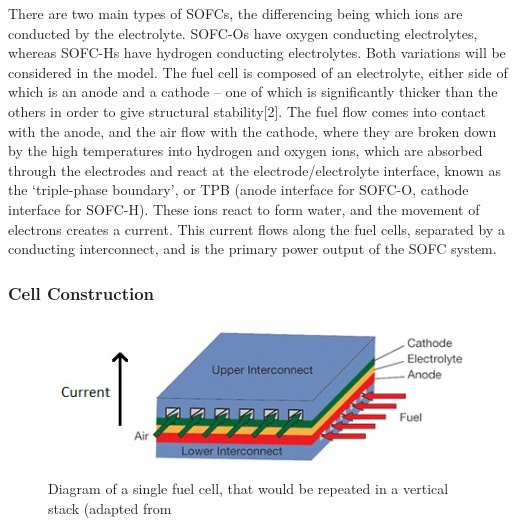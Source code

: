     There are two main types of SOFCs, the differencing being which ions are conducted by the electrolyte. SOFC-Os have oxygen conducting electrolytes, whereas SOFC-Hs have hydrogen conducting electrolytes. Both variations will be considered in the model.
The fuel cell is composed of an electrolyte, either side of which is an anode and a cathode – one of which is significantly thicker than the others in order to give structural stability[2]. The fuel flow comes into contact with the anode, and the air flow with the cathode, where they are broken down by the high temperatures into hydrogen and oxygen ions, which are absorbed through the electrodes and react at the electrode/electrolyte interface, known as the ‘triple-phase boundary’, or TPB (anode interface for SOFC-O, cathode interface for SOFC-H). These ions react to form water, and the movement of electrons creates a current. This current flows along the fuel cells, separated by a conducting interconnect, and is the primary power output of the SOFC system.

    \subsubsection{Cell Construction}
    
     \begin{figure}[h!]
        \centering
        \includegraphics[scale = 4]{fuelcelldiagramedit.jpg}
        \caption{Diagram of a single fuel cell, that would be repeated in a vertical stack (adapted from \cite{lewisref8}}
        \label{fig:SOFCconstruction}
    \end{figure}
    
